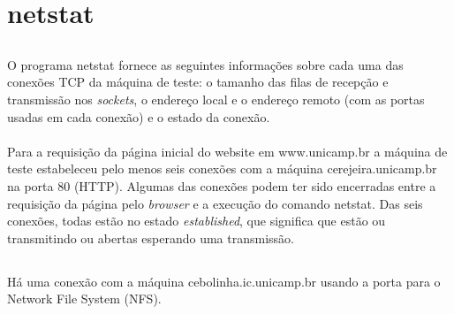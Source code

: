 \documentclass[a4paper,10pt,oneside,final,titlepage,onecolumn]{article}
\begin{document}
\section{netstat}

\subsection{}
\paragraph{}O programa netstat fornece as seguintes informações sobre cada uma das conexões TCP da máquina de teste: o tamanho das filas de recepção e transmissão nos \emph{sockets}, o endereço local e o endereço remoto (com as portas usadas em cada conexão) e o estado da conexão. \paragraph{}Para a requisição da página inicial do website em \mbox{www.unicamp.br} a máquina de teste estabeleceu pelo menos seis conexões com a máquina \mbox{cerejeira.unicamp.br} na porta 80 (HTTP). Algumas das conexões podem ter sido encerradas entre a requisição da página pelo \emph{browser} e a execução do comando netstat. Das seis conexões, todas estão no estado \emph{established}, que significa que estão ou transmitindo ou abertas esperando uma transmissão.

\subsection{}
\paragraph{}Há uma conexão com a máquina \mbox{cebolinha.ic.unicamp.br} usando a porta para o Network File System (NFS).

\subsection{}
\end{document}
